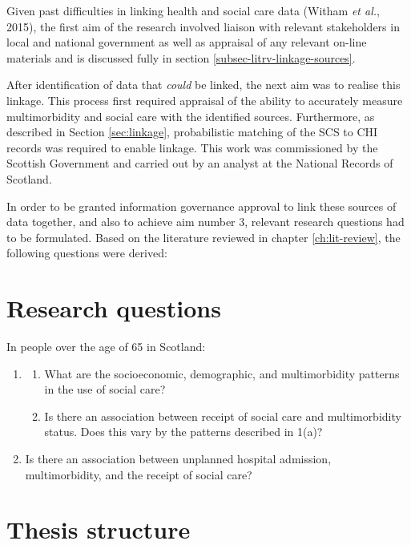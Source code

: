 \documentclass[12pt,a4paper,oneside,table]{report}
\begin{document}
Given past difficulties in linking health and social care data (Witham
\emph{et al.}, 2015), the first aim of the research involved liaison
with relevant stakeholders in local and national government as well as
appraisal of any relevant on-line materials and is discussed fully in
section \ref{subsec-litrv-linkage-sources}.

After identification of data that \emph{could} be linked, the next aim
was to realise this linkage. This process first required appraisal of
the ability to accurately measure multimorbidity and social care with
the identified sources. Furthermore, as described in Section
\ref{sec:linkage}, probabilistic matching of the SCS to CHI records was
required to enable linkage. This work was commissioned by the Scottish
Government and carried out by an analyst at the National Records of
Scotland.

In order to be granted information governance approval to link these
sources of data together, and also to achieve aim number 3, relevant
research questions had to be formulated. Based on the literature
reviewed in chapter \ref{ch:lit-review}, the following questions were
derived:

\section{Research questions}\label{sec:rqs}

In people over the age of 65 in Scotland:

\begin{enumerate}[noitemsep]
\item 
\begin{enumerate}[noitemsep]
\item What are the socioeconomic, demographic, and multimorbidity patterns in the use of social care? 
\item Is there an association between receipt of social care and multimorbidity status. Does this vary by the patterns described in 1(a)?  
\end{enumerate}
\item Is there an association between unplanned hospital admission, multimorbidity, and the receipt of social care?
\end{enumerate}

\section{Thesis structure}\label{sec:lit-review-structure}
\end{document}
